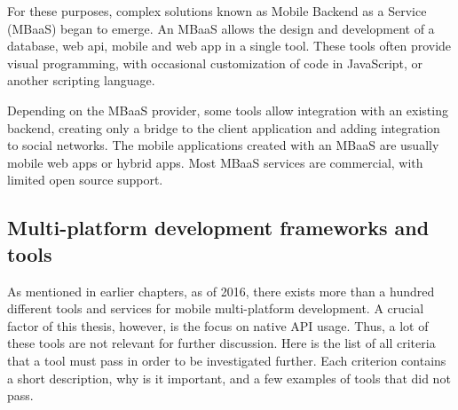 \documentclass[english,master,public,dept460,male,cpdeclaration,oneside]{diploma}
\begin{document}
For these purposes, complex solutions known as Mobile Backend as a Service (MBaaS) began to emerge. An MBaaS allows the design and development of a database, web api, mobile and web app in a single tool. These tools often provide visual programming, with occasional customization of code in JavaScript, or another scripting language. 

Depending on the MBaaS provider, some tools allow integration with an existing backend, creating only a bridge to the client application and adding integration to social networks. The mobile applications created with an MBaaS are usually mobile web apps or hybrid apps. Most MBaaS services are commercial, with limited open source support.

\subsection{Multi-platform development frameworks and tools}
As mentioned in earlier chapters, as of 2016, there exists more than a hundred different tools and services for mobile multi-platform development. A crucial factor of this thesis, however, is the focus on native API usage. Thus, a lot of these tools are not relevant for further discussion. Here is the list of all criteria that a tool must pass in order to be investigated further. Each criterion contains a short description, why is it important, and a few examples of tools that did not pass.
\end{document}
